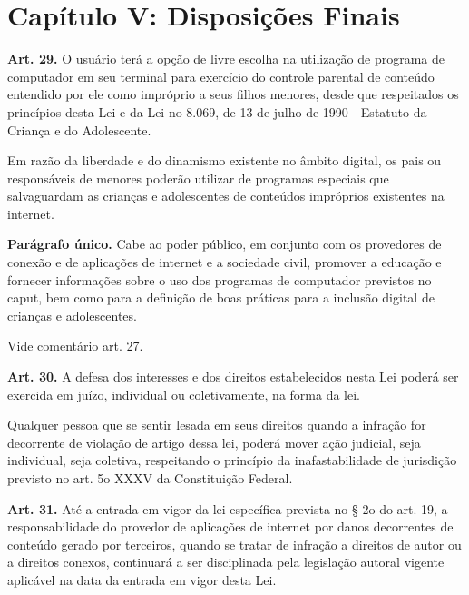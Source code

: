 \section{Capítulo V: Disposições Finais}


\noindent\textbf{Art. 29.} O usuário terá a opção de livre escolha na utilização de programa de computador em seu terminal para exercício do controle parental de conteúdo entendido por ele como impróprio a seus filhos menores, desde que respeitados os princípios desta Lei e da Lei no 8.069, de 13 de julho de 1990 - Estatuto da Criança e do Adolescente.

\begin{displayquote}  
    Em razão da liberdade e do dinamismo existente no âmbito digital, os pais ou
    responsáveis de menores poderão utilizar de programas especiais que salvaguardam as
    crianças e adolescentes de conteúdos impróprios existentes na internet.
\end{displayquote}  

\noindent\textbf{Parágrafo único.} Cabe ao poder público, em conjunto com os provedores de conexão e de aplicações de internet e a sociedade civil, promover a educação e fornecer informações sobre o uso dos programas de computador previstos no caput, bem como para a definição de boas práticas para a inclusão digital de crianças e adolescentes.

\begin{displayquote}
    Vide comentário art. 27.
\end{displayquote}


\noindent\textbf{Art. 30.} A defesa dos interesses e dos direitos estabelecidos nesta Lei poderá ser exercida em juízo, individual ou coletivamente, na forma da lei.

\begin{displayquote}  
    Qualquer pessoa que se sentir lesada em seus direitos quando a infração for decorrente
    de violação de artigo dessa lei, poderá mover ação judicial, seja individual, seja
    coletiva, respeitando o princípio da inafastabilidade de jurisdição previsto no art. 5o
    XXXV da Constituição Federal.
\end{displayquote}  


\noindent\textbf{Art. 31.} Até a entrada em vigor da lei específica prevista no § 2o do art. 19, a responsabilidade do provedor de aplicações de internet por danos decorrentes de conteúdo gerado por terceiros, quando se tratar de infração a direitos de autor ou a direitos conexos, continuará a ser disciplinada pela legislação autoral vigente aplicável na data da entrada em vigor desta Lei.

